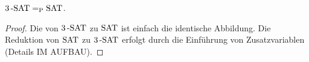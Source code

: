 \begin{thm}
	${3}\operatorname{-SAT} =_{\operatorname{P}}  \operatorname{SAT}$. 
\end{thm} 
\begin{proof}
	Die von  ${3}\operatorname{-SAT}$ zu $\operatorname{SAT}$ ist einfach die identische Abbildung. Die Reduktion von $\operatorname{SAT}$ zu ${3}\operatorname{-SAT}$ erfolgt durch die Einführung von Zusatzvariablen (Details IM AUFBAU). 
\end{proof} 
